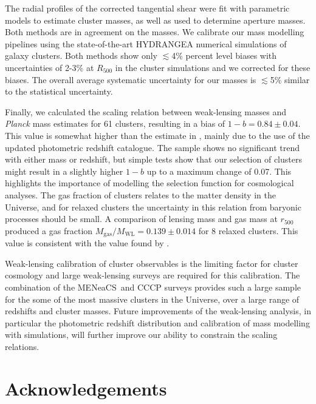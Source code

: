 \documentclass[useAMS,usenatbib]{mnras}
\newcommand{\mn}{MENeaCS}
\begin{document}
The radial profiles of the corrected tangential shear were fit with parametric models to estimate cluster masses, as well as used to determine aperture masses. Both methods are in agreement on the masses. We calibrate our mass modelling pipelines using the state-of-the-art HYDRANGEA numerical simulations of galaxy clusters. Both methods show only  $\lesssim$4\% percent level biases with uncertainties of 2-3\% at $R_{500}$ in the cluster simulations and we corrected for these biases. The overall average systematic uncertainty for our masses is $\lesssim$5\% similar to the statistical uncertainty.

Finally, we calculated the scaling relation between weak-lensing masses and \textit{Planck} mass estimates for 61 clusters, resulting in a bias of $1-b=0.84 \pm 0.04$. This value is somewhat higher than the estimate in , mainly due to the use of the updated photometric redshift catalogue. The sample shows no significant trend with either mass or redshift, but simple tests show that our selection of clusters might result in a slightly higher $1-b$ up to a maximum change of 0.07. This highlights the importance of modelling the selection function for cosmological analyses. The gas fraction of clusters relates to the matter density in the Universe, and for relaxed clusters the uncertainty in this relation from baryonic processes should be small. A comparison of lensing mass and gas mass at $r_{500}$ produced a gas fraction $M_\mathrm{gas} / M_\mathrm{WL} = 0.139 \pm 0.014$ for 8 relaxed clusters. This value is consistent with the value found by \citet{mantz16}. 



Weak-lensing calibration of cluster observables is the limiting factor for cluster cosmology and large weak-lensing surveys are required for this calibration. The combination of the \mn \ and CCCP surveys provides such a large sample for the some of the most massive clusters in the Universe, over a large range of redshifts and cluster masses. Future improvements of the weak-lensing analysis, in particular the photometric redshift distribution and calibration of mass modelling with simulations, will further improve our ability to constrain the scaling relations. 






\section*{Acknowledgements}
\end{document}
